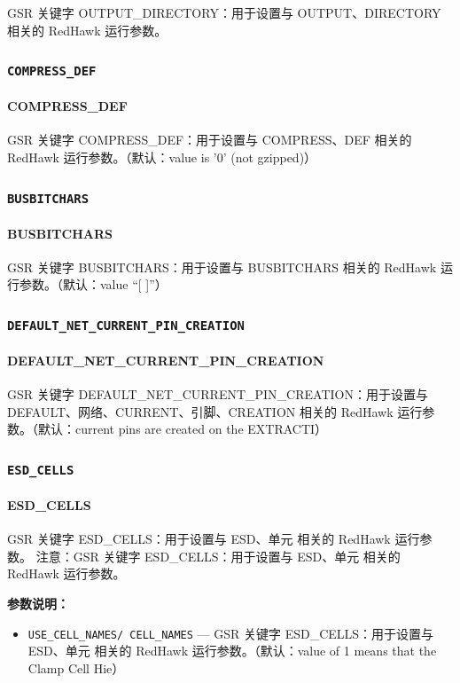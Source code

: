 GSR 关键字 OUTPUT_DIRECTORY：用于设置与 OUTPUT、DIRECTORY 相关的 RedHawk 运行参数。

\subsubsection{\texttt{COMPRESS_DEF}}
\paragraph*{COMPRESS_DEF}

GSR 关键字 COMPRESS_DEF：用于设置与 COMPRESS、DEF 相关的 RedHawk 运行参数。（默认：value is '0' (not gzipped)）

\subsubsection{\texttt{BUSBITCHARS}}
\paragraph*{BUSBITCHARS}

GSR 关键字 BUSBITCHARS：用于设置与 BUSBITCHARS 相关的 RedHawk 运行参数。（默认：value “[ ]”）

\subsubsection{\texttt{DEFAULT_NET_CURRENT_PIN_CREATION}}
\paragraph*{DEFAULT_NET_CURRENT_PIN_CREATION}

GSR 关键字 DEFAULT_NET_CURRENT_PIN_CREATION：用于设置与 DEFAULT、网络、CURRENT、引脚、CREATION 相关的 RedHawk 运行参数。（默认：current pins are created on the EXTRACTI）

\subsubsection{\texttt{ESD_CELLS}}
\paragraph*{ESD_CELLS}

GSR 关键字 ESD_CELLS：用于设置与 ESD、单元 相关的 RedHawk 运行参数。 注意：GSR 关键字 ESD_CELLS：用于设置与 ESD、单元 相关的 RedHawk 运行参数。

\textbf{参数说明：}
\begin{itemize}
\item \texttt{USE\_CELL\_NAMES/ CELL\_NAMES} — GSR 关键字 ESD\_CELLS：用于设置与 ESD、单元 相关的 RedHawk 运行参数。（默认：value of 1 means that the Clamp Cell Hie）
\end{itemize}

